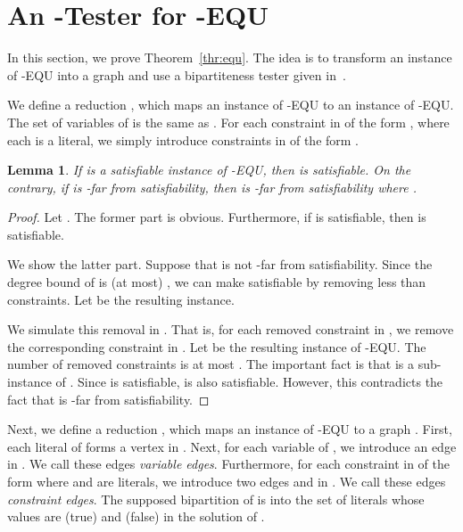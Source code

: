 \documentclass[letterpaper,11pt]{article}
\newtheorem{lemma}[theorem]{Lemma}
\newcommand{\equ}{\textsf{EQU}\xspace}
\newcommand{\kequ}{-\textsf{EQU}\xspace}
\begin{document}
\section{An -Tester for \kequ}\label{apx:equ}
In this section, we prove Theorem~\ref{thr:equ}.
The idea is to transform an instance of \kequ into a graph and use a bipartiteness tester given in~\cite{GR99}.

We define a reduction , which maps an instance  of \kequ to an instance  of -\equ.
The set of variables of  is the same as .
For each constraint in  of the form ,
where each  is a literal,
we simply introduce  constraints in  of the form .

\begin{lemma}\label{lmm:reduction-from-keq}
  If  is a satisfiable instance of \kequ,
  then  is satisfiable.
  On the contrary, if  is -far from satisfiability,
  then  is -far from satisfiability where .
\end{lemma}
\begin{proof}
  Let .
  The former part is obvious.
  Furthermore, if  is satisfiable, then  is satisfiable.

  We show the latter part.
  Suppose that  is not -far from satisfiability.
  Since the degree bound of  is (at most) ,
  we can make  satisfiable by removing less than  constraints.
  Let  be the resulting instance.

  We simulate this removal in .
  That is, for each removed constraint in ,
  we remove the corresponding constraint in .
  Let  be the resulting instance of \kequ.
  The number of removed constraints is at most .
  The important fact is that  is a sub-instance of .
  Since  is satisfiable, 
   is also satisfiable.
  However, this contradicts the fact that  is -far from satisfiability.
\end{proof}

Next,
we define a reduction , which maps an instance  of -\equ to a graph .
First, each literal of  forms a vertex in .
Next, for each variable  of , 
we introduce an edge  in .
We call these edges \textit{variable edges}.
Furthermore, 
for each constraint in  of the form  where  and  are literals,
we introduce two edges  and  in .
We call these edges \textit{constraint edges}.
The supposed bipartition of  is into the set of literals whose values are  (true) and  (false) in the solution of .
\end{document}
